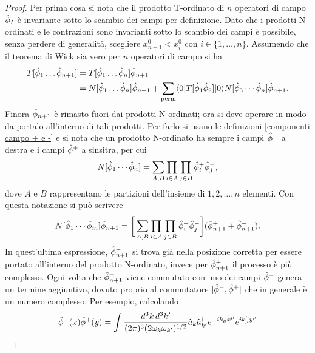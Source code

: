 \begin{proof}
    Per prima cosa si nota che il prodotto T-ordinato di $n$ operatori di campo $\hat{\phi}_I$ è invariante sotto lo scambio dei campi per definizione. Dato che i prodotti N-ordinati e le contrazioni sono invarianti sotto lo scambio dei campi è possibile, senza perdere di generalità, scegliere $x_{n + 1}^0 < x_i^0$ con $i\in\{1,\dots,n\}$. Assumendo che il teorema di Wick sia vero per $n$ operatori di campo si ha
    \begin{equation}
        \begin{split}
            T[\hat{\phi}_1\dots\hat{\phi}_{n+1}] &= T[\hat{\phi}_1\dots\hat{\phi}_n]\hat{\phi}_{n+1} \\
            &= N[\hat{\phi}_1\dots\hat{\phi}_n]\hat{\phi}_{n+1} + \sum_{\mathrm{perm}}\langle 0 | T[\hat{\phi}_1\hat{\phi}_2] | 0 \rangle N[\hat{\phi}_3\cdots\hat{\phi}_n]\hat{\phi}_{n+1}.
        \end{split}
    \end{equation}
    Finora $\hat{\phi}_{n+1}$ è rimasto fuori dai prodotti N-ordinati; ora si deve operare in modo da portalo all'interno di tali prodotti. Per farlo si usano le definizioni \eqref{componenti campo + e -} e si nota che un prodotto N-ordinato ha sempre i campi $\hat{\phi}^-$ a destra e i campi $\hat{\phi}^+$ a sinsitra, per cui
    \begin{equation}
        N[\hat{\phi}_1\cdots\hat{\phi}_n] = \sum_{A,B}\prod_{i\in A}\prod_{j\in B}\hat{\phi}^+_i\hat{\phi}_j^-,
    \end{equation}
    dove $A$ e $B$ rappresentano le partizioni dell'insieme di $1,2,\dots,n$ elementi. Con questa notazione si può scrivere
    \begin{equation}
    \label{eq: prodotto N-ordinato Wick's proof}
        N[\hat{\phi}_1\cdots\hat{\phi}_m]\hat{\phi}_{n+1} = \bigg[\sum_{A,B}\prod_{i\in A}\prod_{j\in B}\hat{\phi}^+_i\hat{\phi}_j^-\bigg](\hat{\phi}^+_{n+1} + \hat{\phi}^-_{n+1}).
    \end{equation}
    In quest'ultima espressione, $\hat{\phi}^-_{n+1}$ si trova già nella posizione corretta per essere portato all'interno del prodotto N-ordinato, invece per $\hat{\phi}^+_{n+1}$ il processo è più complesso. Ogni volta che $\hat{\phi}^+_{n+1}$ viene commutato con uno dei campi $\hat{\phi}^-$ genera un termine aggiuntivo, dovuto proprio al commutatore $[\hat{\phi}^-,\hat{\phi}^+]$ che in generale è un numero complesso. Per esempio, calcolando 
    \begin{equation}
        \begin{split}
            \hatphi^-(x)\hatphi^+(y) &= \int\frac{d^3k\,d^3k'}{(2\pi)^3(2\omega_k\omega_{k'})^{1/2}}\hata_k\hataT_{k'}e^{-ik_\mu x^\mu}e^{ik'_\mu y^\mu} \\

\end{split}
\end{equation}
\end{proof}
